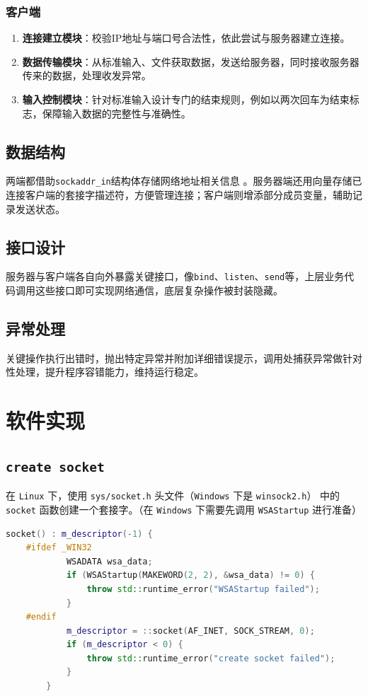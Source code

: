 \documentclass{article}
\begin{document}
\subsubsection{客户端}
\begin{enumerate}
	\item \textbf{连接建立模块}：校验IP地址与端口号合法性，依此尝试与服务器建立连接。
	\item \textbf{数据传输模块}：从标准输入、文件获取数据，发送给服务器，同时接收服务器传来的数据，处理收发异常。
	\item \textbf{输入控制模块}：针对标准输入设计专门的结束规则，例如以两次回车为结束标志，保障输入数据的完整性与准确性。
\end{enumerate}

\subsection{数据结构}
两端都借助\verb|sockaddr_in|结构体存储网络地址相关信息 。服务器端还用向量存储已连接客户端的套接字描述符，方便管理连接；客户端则增添部分成员变量，辅助记录发送状态。

\subsection{接口设计}
服务器与客户端各自向外暴露关键接口，像\verb|bind|、\verb|listen|、\verb|send|等，上层业务代码调用这些接口即可实现网络通信，底层复杂操作被封装隐藏。

\subsection{异常处理}
关键操作执行出错时，抛出特定异常并附加详细错误提示，调用处捕获异常做针对性处理，提升程序容错能力，维持运行稳定。

\section{软件实现}

\subsection{\texttt{create socket}}

在 \texttt{Linux} 下，使用 \texttt{sys/socket.h} 头文件（\texttt{Windows} 下是 \texttt{winsock2.h}） 中的 \texttt{socket} 函数创建一个套接字。（在 \texttt{Windows} 下需要先调用 \texttt{WSAStartup} 进行准备）

\begin{lstlisting}[language=C++, title=创建套接字]
        socket() : m_descriptor(-1) {
    #ifdef _WIN32
            WSADATA wsa_data;
            if (WSAStartup(MAKEWORD(2, 2), &wsa_data) != 0) {
                throw std::runtime_error("WSAStartup failed");
            }
    #endif
            m_descriptor = ::socket(AF_INET, SOCK_STREAM, 0);
            if (m_descriptor < 0) {
                throw std::runtime_error("create socket failed");
            }
        } 
\end{lstlisting}
\end{document}
